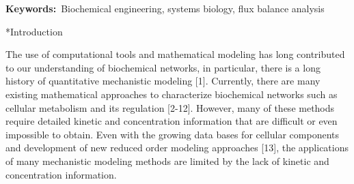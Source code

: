 \documentclass[12pt]{article}
\makeatletter
\renewcommand\section{\@startsection
	{subsection}{2}{0mm}
	{-0.2in}
	{0.05\baselineskip}
	{\normalfont\large\bfseries}}
\makeatother
\begin{document}
\vspace{0.1in}
{\noindent \textbf{Keywords:}~Biochemical engineering, systems biology, flux balance analysis}




\pagebreak

\setcounter{page}{1}



\section*{Introduction}

The use of computational tools and mathematical modeling has long contributed to our understanding of biochemical networks, in particular, there is a long history of quantitative mechanistic modeling [1]. Currently, there are many existing mathematical approaches to characterize biochemical networks such as cellular metabolism and its regulation [2-12]. However, many of these methods require detailed kinetic and concentration information that are difficult or even impossible to obtain. Even with the growing data bases for cellular components and development of new reduced order modeling approaches [13], the applications of many mechanistic modeling methods are limited by the lack of kinetic and concentration information. 
\end{document}
